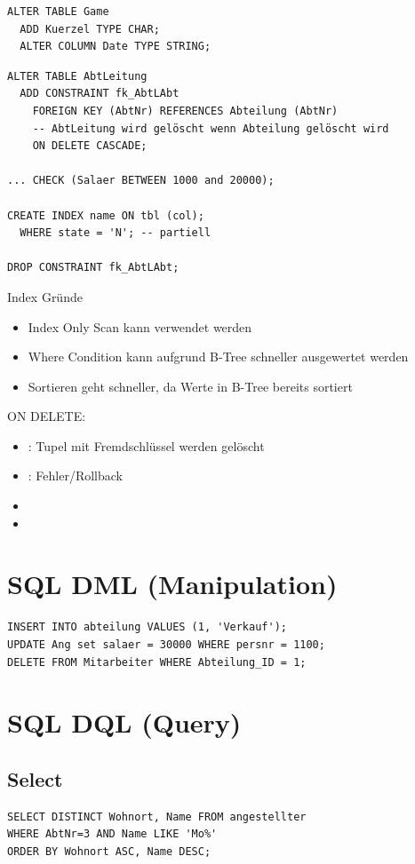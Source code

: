\begin{multicols*}{3}
\begin{verbatim}
ALTER TABLE Game
  ADD Kuerzel TYPE CHAR;
  ALTER COLUMN Date TYPE STRING;
\end{verbatim}

\begin{verbatim}
ALTER TABLE AbtLeitung
  ADD CONSTRAINT fk_AbtLAbt
    FOREIGN KEY (AbtNr) REFERENCES Abteilung (AbtNr)
    -- AbtLeitung wird gelöscht wenn Abteilung gelöscht wird
    ON DELETE CASCADE;

... CHECK (Salaer BETWEEN 1000 and 20000);

CREATE INDEX name ON tbl (col);
  WHERE state = 'N'; -- partiell

DROP CONSTRAINT fk_AbtLAbt;
\end{verbatim}

Index Gründe
\begin{itemize}
    \item Index Only Scan kann verwendet werden
    \item Where Condition kann aufgrund B-Tree schneller ausgewertet werden
    \item Sortieren geht schneller, da Werte in B-Tree bereits sortiert
\end{itemize}

ON DELETE:

\begin{itemize}
  \item {}: Tupel mit Fremdschlüssel werden gelöscht
  \item {}: Fehler/Rollback
  \item {}
  \item {}
\end{itemize}

\section{SQL DML (Manipulation)}
\begin{verbatim}
INSERT INTO abteilung VALUES (1, 'Verkauf');
UPDATE Ang set salaer = 30000 WHERE persnr = 1100;
DELETE FROM Mitarbeiter WHERE Abteilung_ID = 1;
\end{verbatim}

\section{SQL DQL (Query)}

\subsection{Select}
\begin{verbatim}
SELECT DISTINCT Wohnort, Name FROM angestellter
WHERE AbtNr=3 AND Name LIKE 'Mo%'
ORDER BY Wohnort ASC, Name DESC;
\end{verbatim}


\end{multicols*}
